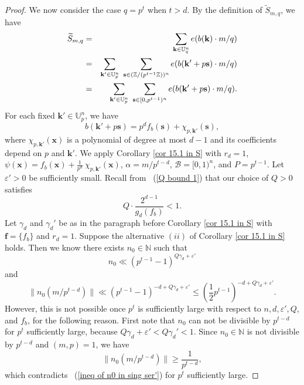 \documentclass[12pt]{amsart}
\theoremstyle{definition}
\theoremstyle{remark}
\numberwithin{equation}{section}
\begin{document}
\begin{proof}
We now consider the case $q = p^t$ when $t>d$. By the definition of $\widetilde{S}_{ {m}, q }$, we have
\begin{eqnarray}
\label{widetile S part 3-1}
\widetilde{S}_{ {m}, q } &=& \sum_{\mathbf{k} \in \mathbb{U}_q^n} e(  {b}(\mathbf{k}) \cdot  {m}/q )
\\
&=& \sum_{\mathbf{k}' \in \mathbb{U}_p^n} \  \sum_{ \mathbf{s} \in (\mathbb{Z} / (p^{t-1} \mathbb{Z}) )^n  } e( {b}(\mathbf{k}' + p \mathbf{s}) \cdot {m}/q )
\notag
\\
&=& \sum_{\mathbf{k}' \in \mathbb{U}_p^n} \  \sum_{ \mathbf{s} \in [0,p^{t-1})^n   } e(  {b}(\mathbf{k}' + p \mathbf{s}) \cdot {m}/q ).
\notag
\end{eqnarray}
For each fixed $\mathbf{k}' \in \mathbb{U}_p^n$, we have
$$
b(\mathbf{k}' + p \mathbf{s}) = p^d  f_b( \mathbf{s}) + \chi_{p, \mathbf{k}'}(\mathbf{s}),
$$
where $\chi_{p, \mathbf{k}'}(\mathbf{x})$ is a polynomial of degree at most $d-1$ and its coefficients depend on $p$ and $\mathbf{k}'$.
We apply Corollary \ref{cor 15.1 in S} with $r_d=1$, $\psi(\mathbf{x}) = f_b( \mathbf{x}) + \frac{1}{p^d} \ \chi_{p, \mathbf{k}'}(\mathbf{x})$, $ {\alpha} = {m}/p^{t-d}$, $\mathcal{B} = [0,1)^{n}$, and $P = p^{t-1}$.
Let $\varepsilon' > 0$ be sufficiently small.
Recall from ~(\ref{Q bound 1}) that our choice of $Q>0$ satisfies $$Q \cdot \frac{2^{d-1}}{g_d( f_b)} < 1. $$
Let $\gamma_d$ and $\gamma_d'$ be as in the paragraph before Corollary \ref{cor 15.1 in S} with $\mathbf{f} = \{ f_b \}$ and $r_d = 1$.
Suppose the alternative $(ii)$ of Corollary \ref{cor 15.1 in S} holds. Then we know there exists $n_0 \in \mathbb{N}$ such that
$$
n_0 \ll (p^{t-1}-1)^{Q \gamma_d + \varepsilon'}
$$
and
\begin{equation}
\label{ineq of n0 in sing ser'}
\| n_0 ( {m}/p^{t-d})  \| \ll (p^{t-1}-1)^{-d + Q \gamma_d + \varepsilon'} \leq \left( \frac{1}{2}p^{t-1} \right)^{-d + Q \gamma_d + \varepsilon'}.
\end{equation}
However, this is not possible once $p^t$ is sufficiently large with respect to $n,d, \varepsilon', Q$, and $ {f_b}$, for the following reason. First note that $n_0$ can not be divisible by $p^{t-d}$ for $p^t$ sufficiently large, because
$Q \gamma_d + \varepsilon' < Q \gamma_d' < 1$. Since $n_0 \in \mathbb{N}$ is not divisible by $p^{t-d}$ and $(m,p)=1$, we have
$$
\| n_0 ( {m}/p^{t-d})  \| \geq \frac{1}{p^{t-d}},
$$
which contradicts ~(\ref{ineq of n0 in sing ser'}) for $p^t$ sufficiently large.


\end{proof}
\end{document}
